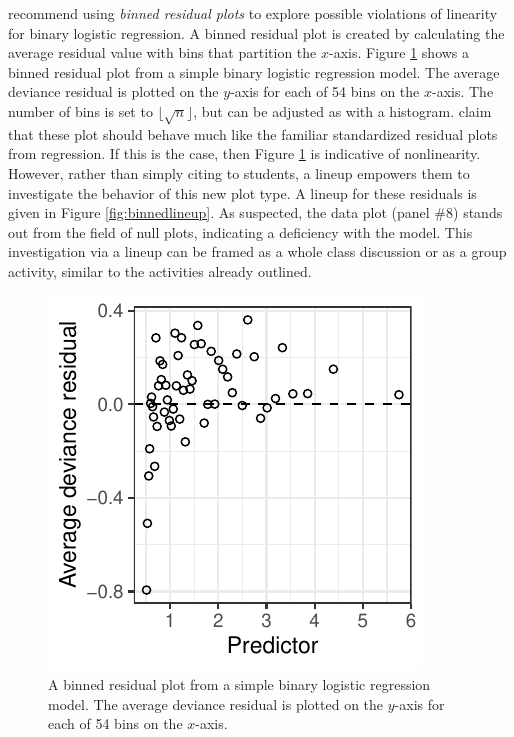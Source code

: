 \documentclass[12pt]{article}
\begin{document}
\citet{GelmanHill:2007} recommend using \emph{binned residual plots} to
explore possible violations of linearity for binary logistic regression.
A binned residual plot is created by calculating the average residual
value with bins that partition the \(x\)-axis. Figure \ref{fig:binned}
shows a binned residual plot from a simple binary logistic regression
model. The average deviance residual is plotted on the \(y\)-axis for
each of 54 bins on the \(x\)-axis. The number of bins is set to
\(\lfloor \sqrt{n} \rfloor\), but can be adjusted as with a histogram.
\citet{GelmanHill:2007} claim that these plot should behave much like
the familiar standardized residual plots from regression. If this is the
case, then Figure \ref{fig:binned} is indicative of nonlinearity.
However, rather than simply citing \citet{GelmanHill:2007} to students,
a lineup empowers them to investigate the behavior of this new plot
type. A lineup for these residuals is given in Figure
\ref{fig:binnedlineup}. As suspected, the data plot (panel \#8) stands
out from the field of null plots, indicating a deficiency with the
model. This investigation via a lineup can be framed as a whole class
discussion or as a group activity, similar to the activities already
outlined.

\begin{figure}
\centering
\includegraphics{figs/binned_resid_example.pdf}
\caption{\label{fig:binned} A binned residual plot from a simple binary
logistic regression model. The average deviance residual is plotted on
the \(y\)-axis for each of 54 bins on the \(x\)-axis.}
\end{figure}
\end{document}
